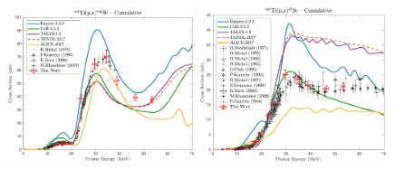 \begin{figure}
 
 \includegraphics[width=0.49\textwidth]{./figures/44Sc.pdf}
 \includegraphics[width=0.49\textwidth]{./figures/47Sc.pdf}

\vspace{-20pt} 
\end{figure}

